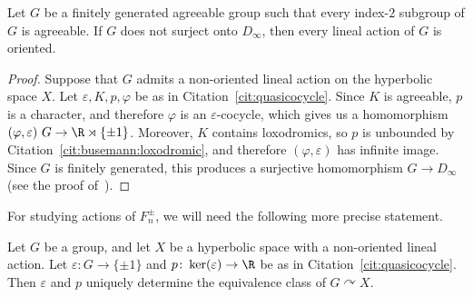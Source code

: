 \begin{coro}\label{cor:nonoriented}
Let $G$ be a finitely generated agreeable group such that every index-$2$ subgroup of $G$ is agreeable. If $G$ does not surject onto $D_\infty$, then every lineal action of $G$ is oriented.
\end{coro}

\begin{proof}
Suppose that $G$ admits a non-oriented lineal action on the hyperbolic space $X$. Let $\varepsilon, K, p, \varphi$ be as in Citation~\ref{cit:quasicocycle}. Since $K$ is agreeable, $p$ is a character, and therefore $\varphi$ is an $\varepsilon$-cocycle, which gives us a homomorphism $(\varphi, \varepsilon) \ G \to \R \rtimes \{ \pm 1 \}$. Moreover, $K$ contains loxodromics, so $p$ is unbounded by Citation~\ref{cit:busemann:loxodromic}, and therefore $(\varphi, \varepsilon)$ has infinite image. Since $G$ is finitely generated, this produces a surjective homomorphism $G \to D_\infty$ (see the proof of~\cite[Proposition 3.1]{NL}).
\end{proof}

For studying actions of $F_n^{\pm}$, we will need the following more precise statement.

\begin{prop}
\label{prop:nonoriented:classification}

Let $G$ be a group, and let $X$ be a hyperbolic space with a non-oriented lineal action. Let $\varepsilon \colon G \to \{ \pm 1 \}$ and $p \colon \ker(\varepsilon) \to \R$ be as in Citation~\ref{cit:quasicocycle}. Then $\varepsilon$ and $p$ uniquely determine the equivalence class of $G \curvearrowright X$.
\end{prop}

